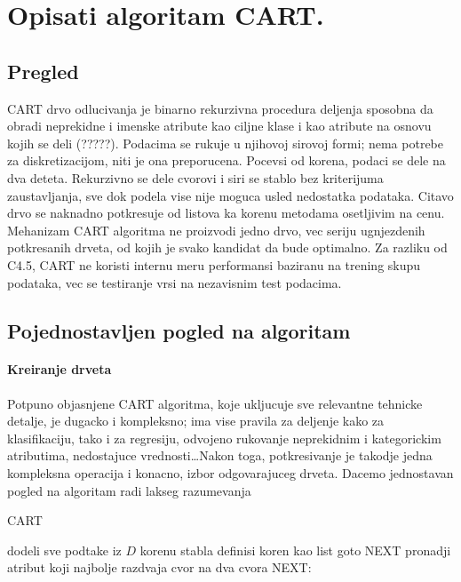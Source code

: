 \documentclass[a4paper]{article}
\begin{document}
\section{Opisati algoritam CART.}
\subsection{Pregled}
CART drvo odlucivanja je binarno rekurzivna procedura deljenja sposobna da obradi neprekidne i
imenske atribute kao ciljne klase i kao atribute na osnovu kojih se deli (?????). Podacima se rukuje
u njihovoj sirovoj formi; nema potrebe za diskretizacijom, niti je ona preporucena. Pocevsi od
korena, podaci se dele na dva deteta. Rekurzivno se dele cvorovi i siri se stablo bez kriterijuma
zaustavljanja, sve dok podela vise nije moguca usled nedostatka podataka. Citavo drvo se naknadno
potkresuje od listova ka korenu metodama osetljivim na cenu. Mehanizam CART algoritma ne proizvodi
jedno drvo, vec seriju ugnjezdenih potkresanih drveta, od kojih je svako kandidat da bude optimalno.
Za razliku od C4.5, CART ne koristi internu meru performansi baziranu na trening skupu podataka, vec
se testiranje vrsi na nezavisnim test podacima.
\subsection{Pojednostavljen pogled na algoritam}

\paragraph{Kreiranje drveta} Potpuno objasnjene CART algoritma, koje ukljucuje sve relevantne
tehnicke detalje, je dugacko i kompleksno; ima vise pravila za deljenje kako za klasifikaciju, tako
i za regresiju, odvojeno rukovanje neprekidnim i kategorickim atributima, nedostajuce
vrednosti\ldots Nakon toga, potkresivanje je takodje jedna kompleksna operacija i konacno, izbor
odgovarajuceg drveta. Dacemo jednostavan pogled na algoritam radi lakseg razumevanja

\begin{algorithm}[H]
    \caption{CART}\label{code:cart}
    \begin{algorithmic}[1]
            \State dodeli sve podtake iz \(D\) korenu stabla
            \State definisi koren kao list
                \State goto NEXT
                \EndIf
                \State pronadji atribut koji najbolje razdvaja cvor na dva cvora
                \State NEXT:
            \EndFor
\EndProcedure
\end{algorithmic}
\end{algorithm}
\end{document}
